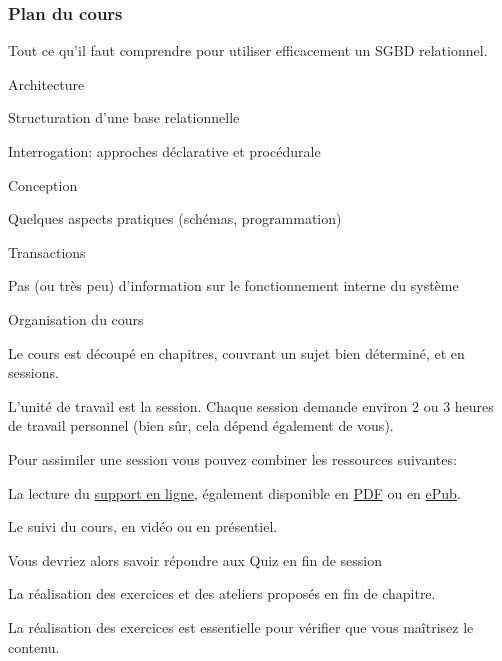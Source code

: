 
\begin{frame}
\frametitle{Plan du cours}

\alert{Tout} ce qu'il faut comprendre pour \alert{utiliser} efficacement un SGBD relationnel.

\begin{redbullet}
  \item Architecture 
  \item Structuration d'une base relationnelle
  \item Interrogation: approches déclarative et procédurale
  \item Conception
  \item Quelques aspects pratiques (schémas, programmation)
  \item Transactions
\end{redbullet}

\vfill

\begin{blocgauche}
Pas (ou très peu) d'information sur le fonctionnement interne du système
\end{blocgauche}

\end{frame}



\begin{frame}{Organisation du cours}

Le cours est découpé en \alert{chapitres}, couvrant un sujet bien déterminé, et en \alert{sessions}.

\smallskip

\alert{L'unité de travail est la session}. Chaque session
demande environ 2 ou 3  heures de travail personnel (bien sûr, cela dépend également de vous).

\vfill


Pour assimiler une session vous pouvez combiner les ressources suivantes:

\begin{redbullet}
  \item \alert{La lecture} du \href{http://sql.bdpedia.fr}{support en ligne}, 
       également disponible en \href{http://sql.bdpedia.fr/files/cbd-sql.pdf}{PDF} ou en 
       \href{http://sql.bdpedia.fr/files/cbd-sql.epub}{ePub}.
    \item \alert{Le suivi du cours}, en vidéo ou en présentiel.
    \item Vous devriez alors  savoir répondre aux Quiz en fin de session
   \item \alert{La réalisation des exercices et des ateliers} proposés en fin de chapitre.
\end{redbullet}

\vfill
\begin{blocgauche}
\alert{La réalisation des exercices est essentielle} pour vérifier que vous maîtrisez le
contenu.
\end{blocgauche}

\end{frame}


